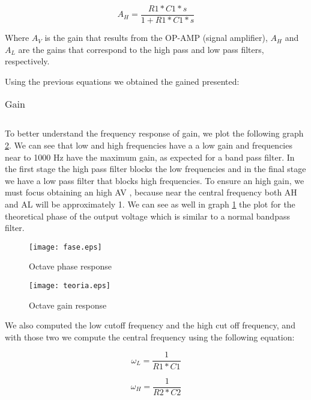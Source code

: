 \begin{equation}
A_{H}=  \frac{R1*C1*s}{1+R1*C1*s}
\end{equation}

Where $A_V$ is the gain that results from the OP-AMP (signal amplifier), $A_H$ and $A_L$ are the gains that correspond to the high pass and low pass filters, respectively.

Using the previous equations we obtained the gained presented:

\begin{table}[H]
\centering
\begin{tabularx}{0.6\textwidth} {
  | >{\raggedright\arraybackslash}X
  | >{\raggedleft\arraybackslash}X | }
 \hline

\end{tabularx}
\caption{Gain}
\end{table}

To better understand the frequency response of gain, we plot the following graph \ref{fig:gain}.  We can see that low and high frequencies have a a low gain and frequencies near to 1000 Hz have the maximum gain, as expected for a band pass filter.
In the first stage the high pass filter blocks the low frequencies and in the final stage we have a low pass filter that blocks high frequencies. To ensure an high gain, we must focus obtaining an high AV , because near the central frequency both AH and AL will be approximately 1. We can see as well in graph \ref{fig:freq} the plot for the theoretical phase of the output voltage which is similar to a normal bandpass filter.

\begin{figure}[H] \centering
\texttt{[image: fase.eps]}
\caption{Octave phase response}
\label{fig:freq}
\end{figure}

\begin{figure}[H] \centering
\texttt{[image: teoria.eps]}
\caption{Octave gain response}
\label{fig:gain}
\end{figure}
We also computed the low cutoff frequency and the high cut off frequency, and with those two we compute the central frequency using the following equation:

\begin{equation}
\omega_{L}= \frac{1}{R1*C1}
\end{equation}

\begin{equation}
\omega_{H}= \frac{1}{R2*C2}
\end{equation}

